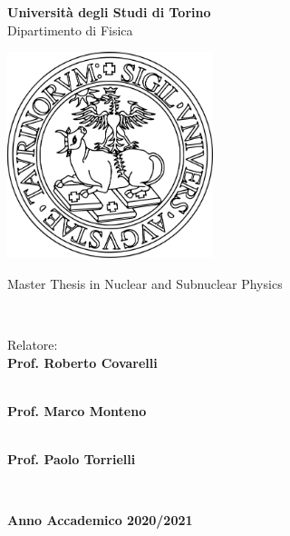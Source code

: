 \makeatletter
\begin{center}
{\LARGE \textbf{Università degli Studi di Torino}} \\
\vspace{0.2cm}
{\Large {Dipartimento di Fisica}} \\ 
\vspace{1cm}

\includegraphics[width=6cm]{Cover/img/unito-logo.png} \\
\vspace{1.1cm}

{\Large {Master Thesis in Nuclear and Subnuclear Physics}} \\
\vspace{1cm}

{\LARGE \textbf{\@title}} \\ 
\vspace{1.5cm}

\end{center}


\noindent
\begin{minipage}[t]{0.7\textwidth}
\noindent \large{Relatore:} \\
\large{\textbf{Prof. Roberto Covarelli}} \\
\vspace{0.1cm}

 \\
\large{\textbf{Prof. Marco Monteno}} \\
\vspace{0.1cm}

 \\
\large{\textbf{Prof. Paolo Torrielli}} \\
\vspace{0.1cm}

\end{minipage}%
\begin{minipage}[t]{0.3\textwidth}
\mbox{} \\
\end{minipage}

\vfill

\begin{center}
    \large{\textbf{Anno Accademico 2020/2021}}
\end{center}

\vspace{1cm}

\newpage
